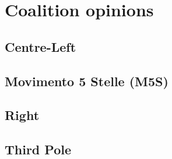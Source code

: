 \section{Coalition opinions}
\label{app:coalition_opinions}

\subsection{Centre-Left}


\subsection{Movimento 5 Stelle (M5S)}


\subsection{Right}


\subsection{Third Pole}
